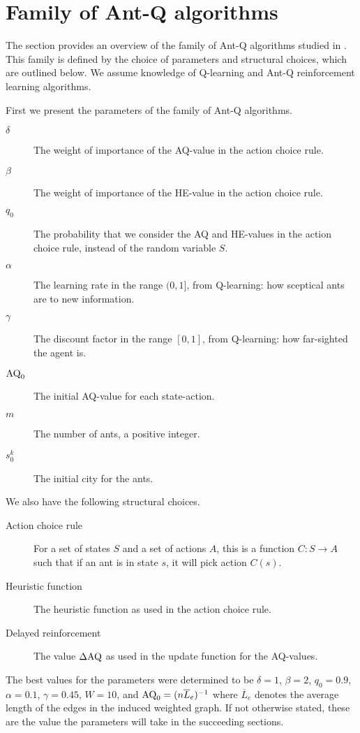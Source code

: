 \section{Family of Ant-Q algorithms}

The section provides an overview of the family of Ant-Q algorithms studied in \cite{dorigo1996study}. This family is defined by the choice of parameters and structural choices, which are outlined below. We assume knowledge of Q-learning and Ant-Q reinforcement learning algorithms.

First we present the parameters of the family of Ant-Q algorithms.

\begin{description}
    \item[$\delta$] The weight of importance of the AQ-value in the action choice rule.
    \item[$\beta$] The weight of importance of the HE-value in the action choice rule.
    \item[$q_0$] The probability that we consider the AQ and HE-values in the action choice rule, instead of the random variable $S$.
    \item[$\alpha$] The learning rate in the range $(0,1]$, from Q-learning: how sceptical ants are to new information.
    \item[$\gamma$] The discount factor in the range $[0,1]$, from Q-learning: how far-sighted the agent is.
    \item[$\operatorname{AQ}_0$] The initial AQ-value for each state-action. 
    \item[$m$] The number of ants, a positive integer.
    \item[$s_0^k$] The initial city for the ants.
\end{description}

We also have the following structural choices.

\begin{description}
    \item[Action choice rule] For a set of states $S$ and a set of actions $A$, this is a function $C: S \to A$ such that if an ant is in state $s$, it will pick action $C(s)$.  
    \item[Heuristic function] The heuristic function as used in the action choice rule.
    \item[Delayed reinforcement] The value $\operatorname{\Delta AQ}$ as used in the update function for the AQ-values.   
\end{description}

The best values for the parameters were determined to be $\delta = 1$, $\beta = 2$, $q_0 = 0.9$, $\alpha = 0.1$, $\gamma = 0.45$, $W = 10$, and $\operatorname{AQ}_0 = (n\overline L_e)^{-1}$ where $\overline L_e$ denotes the average length of the edges in the induced weighted graph. If not otherwise stated, these are the value the parameters will take in the succeeding sections.

